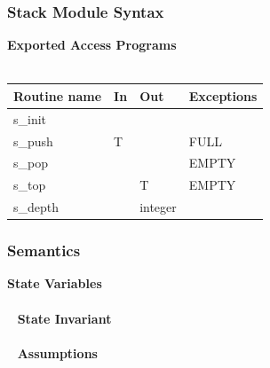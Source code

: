 \documentclass[t,12pt,numbers,fleqn]{beamer}
\begin{document}

\begin{frame}
\frametitle{Stack Module Syntax}

\textbf{Exported Access Programs}\\
~\newline
\begin{tabular}{| l | l | l | l |}
\hline
\textbf{Routine name} & \textbf{In} & \textbf{Out} & \textbf{Exceptions}\\
\hline
s\_init & ~ & ~ & ~\\
\hline
s\_push & T & ~ & FULL\\
\hline
s\_pop & ~ & ~ & EMPTY\\
\hline
s\_top & ~ & T & EMPTY\\
\hline
s\_depth & ~ & integer & ~\\
\hline
\end{tabular}

\end{frame}


\begin{frame}
\frametitle{Semantics}

\textbf{State Variables}\\
~\newline
{}\\
~\newline
\textbf{State Invariant}\\
~\newline
{}\\
~\newline
\textbf{Assumptions}\\
~\newline
{}\\

\end{frame}

\end{document}
